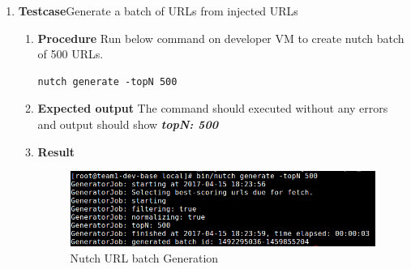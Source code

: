 \begin{enumerate}
\item \textbf{Testcase}\newline Generate a batch of URLs from injected
  URLs
  \begin{enumerate}[label={}]
  \item \textbf{Procedure}\newline
    Run below command on developer VM to create nutch batch of 500 URLs.
    \begin{lstlisting}[style=Bash]
      nutch generate -topN 500
    \end{lstlisting}
  \item \textbf{Expected output}\newline
    The command should executed without any errors and output should
    show \textbf{\textit{topN: 500}}
  \item \textbf{Result}\newline
    \begin{figure}
      \centering
      \includegraphics[scale=0.4]{screenshots/nutch-generate.png}
      \caption{Nutch URL batch Generation}
      \label{nutch-generate}
    \end{figure}
  \end{enumerate}



\end{enumerate}
